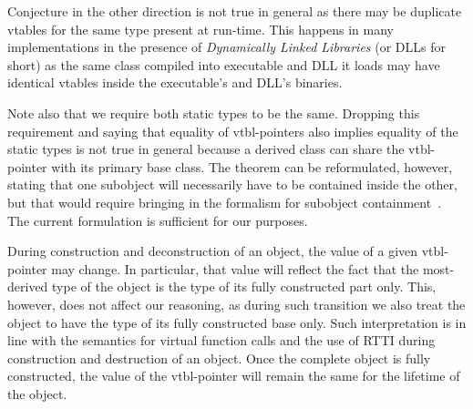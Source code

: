 \noindent
Conjecture in the other direction is not true in general as there may be 
duplicate vtables for the same type present at run-time. This happens in 
many \Cpp{} implementations in the presence of \emph{Dynamically Linked Libraries} 
(or DLLs for short) as the same class compiled into executable and DLL it loads 
may have identical vtables inside the executable's and DLL's binaries.

Note also that we require both static types to be the same. Dropping this 
requirement and saying that equality of vtbl-pointers also implies equality of 
the static types is not true in general because a derived class can share the 
vtbl-pointer with its primary base class. The theorem can be reformulated, 
however, stating that one subobject will necessarily have to be contained inside 
the other, but that would require bringing in the formalism for subobject 
containment~\cite{WNST06}. The current formulation is sufficient for our 
purposes.

%
%
%

During construction and deconstruction of 
an object, the value of a given vtbl-pointer may change. In particular, 
that value will reflect the fact that the most-derived type of the object is the type of its 
fully constructed part only. This, however, does not affect our reasoning, as during 
such transition we also treat the object to have the type of its fully 
constructed base only. Such interpretation is in line with the \Cpp{} semantics for 
virtual function calls and the use of RTTI during construction and destruction of an 
object. Once the complete object is fully constructed, the value of the 
vtbl-pointer will remain the same for the lifetime of the object.

